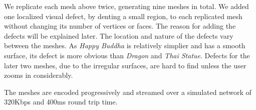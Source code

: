 We replicate each mesh above twice, generating nine meshes in total.  
We added one localized visual defect, by denting a small region, to each replicated mesh 
without changing its number of vertices or faces. The reason for adding the defects will be explained later. 
The location and nature of the
defects vary between the meshes. As \textit{Happy Buddha} is
relatively simplier and has a smooth surface, its defect is
 more obvious than \textit{Dragon}
and \textit{Thai Statue}.  Defects for the later two meshes, due to the
irregular surfaces, are hard to find unless the user zooms in
considerably.

The meshes are encoded progressively and streamed over a simulated network of 320Kbps and 400ms round trip time.  

%
% 
%

